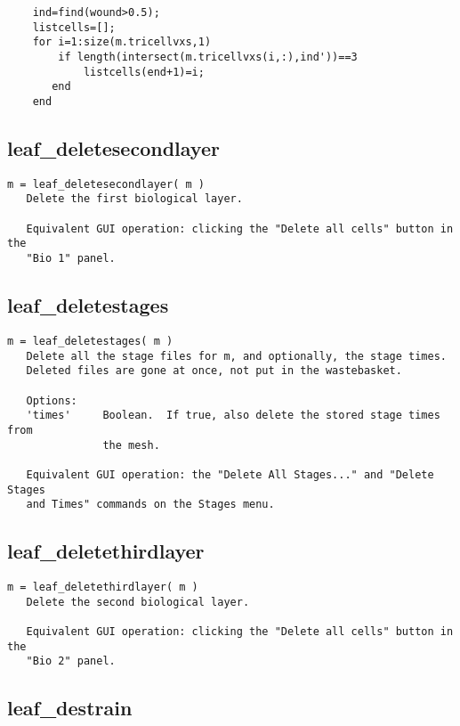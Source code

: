 \begin{verbatim}
    ind=find(wound>0.5);
    listcells=[];
    for i=1:size(m.tricellvxs,1)
        if length(intersect(m.tricellvxs(i,:),ind'))==3
            listcells(end+1)=i;
       end
    end
\end{verbatim}

\subsection{leaf\_deletesecondlayer}\label{section-leaf-deletesecondlayer}

\begin{verbatim}
m = leaf_deletesecondlayer( m )
   Delete the first biological layer.

   Equivalent GUI operation: clicking the "Delete all cells" button in the
   "Bio 1" panel.
\end{verbatim}

\subsection{leaf\_deletestages}\label{section-leaf-deletestages}

\begin{verbatim}
m = leaf_deletestages( m )
   Delete all the stage files for m, and optionally, the stage times.
   Deleted files are gone at once, not put in the wastebasket.

   Options:
   'times'     Boolean.  If true, also delete the stored stage times from
               the mesh.

   Equivalent GUI operation: the "Delete All Stages..." and "Delete Stages
   and Times" commands on the Stages menu.
\end{verbatim}

\subsection{leaf\_deletethirdlayer}\label{section-leaf-deletethirdlayer}

\begin{verbatim}
m = leaf_deletethirdlayer( m )
   Delete the second biological layer.

   Equivalent GUI operation: clicking the "Delete all cells" button in the
   "Bio 2" panel.
\end{verbatim}

\subsection{leaf\_destrain}\label{section-leaf-destrain}

